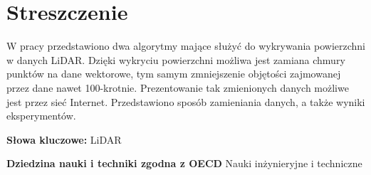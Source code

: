 \chapter*{Streszczenie}

W pracy przedstawiono dwa algorytmy mające służyć do wykrywania powierzchni w danych LiDAR.
Dzięki wykryciu powierzchni możliwa jest zamiana chmury punktów na dane wektorowe, tym samym
zmniejszenie objętości zajmowanej przez dane nawet 100-krotnie. Prezentowanie tak zmienionych danych
możliwe jest przez sieć Internet. Przedstawiono sposób zamieniania danych, a także wyniki eksperymentów.


\bigskip

\noindent\textbf{Słowa kluczowe:} LiDAR

\bigskip

\noindent\textbf{Dziedzina nauki i techniki zgodna z OECD} Nauki inżynieryjne i techniczne
